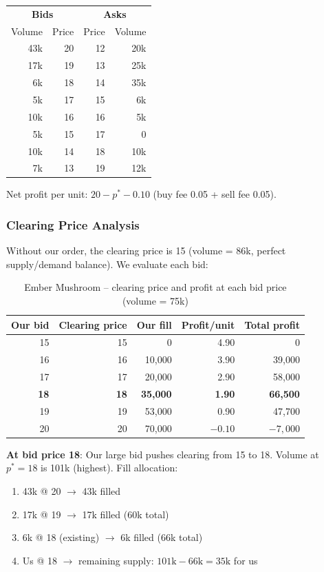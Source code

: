 \documentclass[11pt,a4paper]{article}
\begin{document}
\begin{table}[H]
\centering
\begin{tabular}{@{}rr|rr@{}}
\toprule
\multicolumn{2}{c|}{\textbf{Bids}} & \multicolumn{2}{c}{\textbf{Asks}} \\
Volume & Price & Price & Volume \\
\midrule
43k & 20 & 12 & 20k \\
17k & 19 & 13 & 25k \\
6k  & 18 & 14 & 35k \\
5k  & 17 & 15 & 6k \\
10k & 16 & 16 & 5k \\
5k  & 15 & 17 & 0 \\
10k & 14 & 18 & 10k \\
7k  & 13 & 19 & 12k \\
\bottomrule
\end{tabular}
\end{table}

Net profit per unit: $20 - p^* - 0.10$ (buy fee 0.05 + sell fee 0.05).

\subsubsection{Clearing Price Analysis}

Without our order, the clearing price is 15 (volume = 86k, perfect supply/demand balance). We evaluate each bid:

\begin{table}[H]
\centering
\caption{Ember Mushroom -- clearing price and profit at each bid price (volume = 75k)}
\begin{tabular}{@{}rrrrr@{}}
\toprule
\textbf{Our bid} & \textbf{Clearing price} & \textbf{Our fill} & \textbf{Profit/unit} & \textbf{Total profit} \\
\midrule
15 & 15 & 0      & 4.90 & 0 \\
16 & 16 & 10,000 & 3.90 & 39,000 \\
17 & 17 & 20,000 & 2.90 & 58,000 \\
\textbf{18} & \textbf{18} & \textbf{35,000} & \textbf{1.90} & \textbf{66,500} \\
19 & 19 & 53,000 & 0.90 & 47,700 \\
20 & 20 & 70,000 & $-0.10$ & $-7{,}000$ \\
\bottomrule
\end{tabular}
\end{table}

\textbf{At bid price 18}: Our large bid pushes clearing from 15 to 18. Volume at $p^* = 18$ is 101k (highest). Fill allocation:
\begin{enumerate}
    \item 43k @ 20 $\rightarrow$ 43k filled
    \item 17k @ 19 $\rightarrow$ 17k filled (60k total)
    \item 6k @ 18 (existing) $\rightarrow$ 6k filled (66k total)
    \item Us @ 18 $\rightarrow$ remaining supply: $101\text{k} - 66\text{k} = 35\text{k}$ for us
\end{enumerate}
\end{document}
